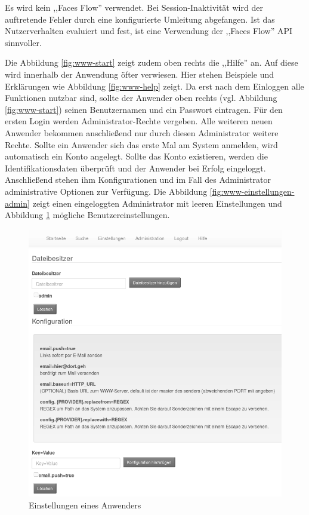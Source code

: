 \documentclass[oneside, ngerman, toc=bibliography,bibliography=totoc,listof=entryprefix, open=right,numbers=noenddot,fontsize=12pt]{scrbook}
\begin{document}
Es wird kein ,,Faces Flow'' verwendet. Bei Session-Inaktivität wird der auftretende Fehler durch eine konfigurierte Umleitung abgefangen. Ist das Nutzerverhalten evaluiert und fest, ist eine Verwendung der ,,Faces Flow'' API sinnvoller.

Die Abbildung  \ref{fig:www-start} zeigt zudem oben rechts die ,,Hilfe'' an. Auf diese wird innerhalb der Anwendung öfter verwiesen. Hier stehen Beispiele und Erklärungen wie Abbildung \ref{fig:www-help} zeigt. 
Da erst nach dem Einloggen alle Funktionen nutzbar sind, sollte der Anwender oben rechts (vgl. Abbildung \ref{fig:www-start}) seinen Benutzernamen und ein Passwort eintragen.
Für den ersten Login werden Administrator-Rechte vergeben. Alle weiteren neuen Anwender bekommen anschließend nur durch diesen Administrator weitere Rechte. Sollte ein Anwender sich das erste Mal am System anmelden, wird automatisch ein Konto angelegt. Sollte das Konto existieren, werden die Identifikationsdaten überprüft und der Anwender bei Erfolg eingeloggt.
Anschließend stehen ihm Konfigurationen und im Fall des Administrator administrative Optionen zur Verfügung.
Die Abbildung \ref{fig:www-einstellungen-admin} zeigt einen eingeloggten Administrator mit leeren Einstellungen und Abbildung \ref{fig:www-einstellungen-user} mögliche Benutzereinstellungen.



\begin{figure}[htbp] 
    \centering
    \includegraphics[width=\textwidth]{Masterarbeit_Bilder/www_einstellungen_user.png}
    \caption{Einstellungen eines Anwenders}
    \label{fig:www-einstellungen-user}
\end{figure}  
\end{document}
